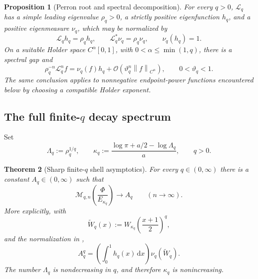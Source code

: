 \documentclass[11pt,oneside]{article}
\newtheorem{theorem}{Theorem}[section]
\newtheorem{proposition}[theorem]{Proposition}
\theoremstyle{definition}
\theoremstyle{remark}
\newcommand{\dd}{\,\mathrm d}
\newcommand{\Phiup}{\Phi}
\newcommand{\bigO}{\mathcal O}
\newcommand{\norm}[1]{\left\lVert#1\right\rVert}
\begin{document}
\begin{proposition}[Perron root and spectral decomposition]
\label{prop:RPF}
For every $q>0$, $\mathcal L_q$ has a simple leading eigenvalue
$\rho_q>0$, a strictly positive eigenfunction $h_q$, and a positive eigenmeasure $\nu_q$,
which may be normalized by
\[
 \mathcal L_qh_q=\rho_qh_q,
 \qquad
 \mathcal L_q^*\nu_q=\rho_q\nu_q,
 \qquad
 \nu_q(h_q)=1.
\]
On a suitable Holder space $C^\alpha[0,1]$, with
$0<\alpha\le\min(1,q)$, there is a spectral gap and
\begin{equation}
 \rho_q^{-n}\mathcal L_q^nf
 =\nu_q(f)h_q+\bigO(\vartheta_q^n\norm f_{C^\alpha}),
 \qquad 0<\vartheta_q<1.
 \label{eq:RPF-convergence}
\end{equation}
The same conclusion applies to nonnegative endpoint-power functions encountered below by
choosing a compatible Holder exponent.
\end{proposition}

\subsection{The full finite-$q$ decay spectrum}

Set
\begin{equation}
 \Lambda_q:=\rho_q^{1/q},
 \qquad
 \kappa_q:=\frac{\log\pi+a/2-\log\Lambda_q}{a},
 \qquad q>0.
 \label{eq:kappa-q}
\end{equation}

\begin{theorem}[Sharp finite-$q$ shell asymptotics]
\label{thm:Lq-spectrum}
For every $q\in(0,\infty)$ there is a constant $A_q\in(0,\infty)$ such that
\begin{equation}
 \mathcal M_{q,n}\!\left(\frac{\Phiup}{E_{\kappa_q}}\right)
 \longrightarrow A_q
 \qquad(n\to\infty).
 \label{eq:Lq-limit}
\end{equation}
More explicitly, with
\[
 \widetilde W_{q}(x)
 :=W_{\kappa_q}\!\left(\frac{x+1}{2}\right)^q,
\]
and the normalization in ,
\begin{equation}
 A_q^q=\left(\int_0^1h_q(x)\dd x\right)\nu_q(\widetilde W_q).
 \label{eq:Aq}
\end{equation}
The number $\Lambda_q$ is nondecreasing in $q$, and therefore $\kappa_q$ is nonincreasing.
\end{theorem}
\end{document}
